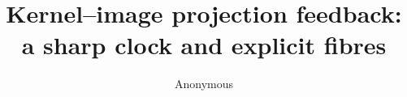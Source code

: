 \documentclass[11pt,a4paper]{amsart}
\title[Kernel--image projection feedback]{Kernel--image projection feedback:\\a sharp clock and explicit fibres}
\author{Anonymous}
\date{}
\begin{document}
\begin{abstract}

\end{abstract}
\maketitle







\end{document}

